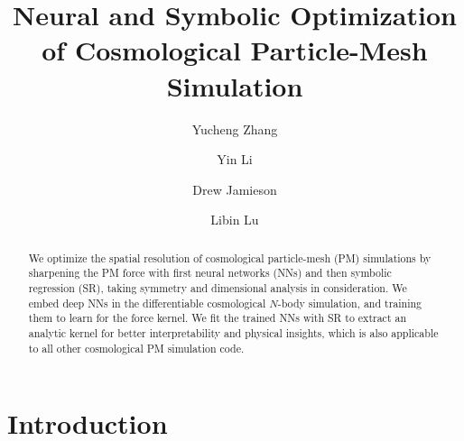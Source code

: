\documentclass[modern, trackchanges, dvipsnames]{aastex631}
\begin{document}
\title{\large Neural and Symbolic Optimization of Cosmological
Particle-Mesh Simulation
\vspace{0.3em}}


\author[0000-0002-9300-2632]{\normalsize Yucheng Zhang}

\author[0000-0002-0701-1410]{\normalsize Yin Li}

\author[0000-0001-5044-7204]{\normalsize Drew Jamieson}

\author[0000-0003-0745-9431]{\normalsize Libin Lu}







\begin{abstract}

We optimize the spatial resolution of cosmological particle-mesh (PM)
simulations by sharpening the PM force with first neural networks (NNs)
and then symbolic regression (SR), taking symmetry and dimensional
analysis in consideration.
We embed deep NNs in the differentiable cosmological $N$-body
simulation, and training them to learn for the force kernel.
We fit the trained NNs with SR to extract an analytic kernel for better
interpretability and physical insights, which is also applicable to all
other cosmological PM simulation code.

\end{abstract}


\vspace{1em}
\section{Introduction}
\end{document}
